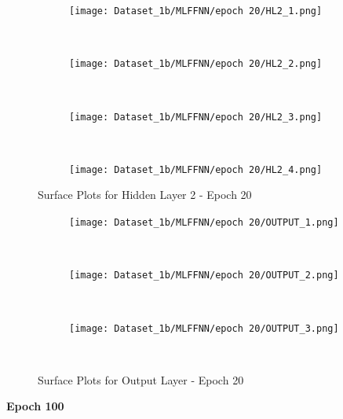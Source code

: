 \begin{figure}[!ht]
    \centering
    \begin{subfigure}[h]{0.5\textwidth}
        \centering
        \texttt{[image: Dataset\_1b/MLFFNN/epoch 20/HL2\_1.png]}
    \end{subfigure}%
    ~ 
    \begin{subfigure}[h]{0.5\textwidth}
        \centering
        \texttt{[image: Dataset\_1b/MLFFNN/epoch 20/HL2\_2.png]}
    \end{subfigure}%
    ~
    
    \begin{subfigure}[h]{0.4\textwidth}
        \centering
        \texttt{[image: Dataset\_1b/MLFFNN/epoch 20/HL2\_3.png]}
    \end{subfigure}
    ~
    \begin{subfigure}[h]{0.4\textwidth}
        \centering
        \texttt{[image: Dataset\_1b/MLFFNN/epoch 20/HL2\_4.png]}
    \end{subfigure}
    \caption{Surface Plots for Hidden Layer 2 - Epoch 20}
    \label{fig:13}
\end{figure}


\begin{figure}[!ht]
    \centering
    \begin{subfigure}[h]{0.5\textwidth}
        \centering
        \texttt{[image: Dataset\_1b/MLFFNN/epoch 20/OUTPUT\_1.png]}
    \end{subfigure}%
    ~ 
    \begin{subfigure}[h]{0.5\textwidth}
        \centering
        \texttt{[image: Dataset\_1b/MLFFNN/epoch 20/OUTPUT\_2.png]}
    \end{subfigure}%
    ~
    
    \begin{subfigure}[h]{0.4\textwidth}
        \centering
        \texttt{[image: Dataset\_1b/MLFFNN/epoch 20/OUTPUT\_3.png]}
    \end{subfigure}
    ~
    \caption{Surface Plots for Output Layer - Epoch 20}
    \label{fig:13}
\end{figure}




\newpage

\textbf{Epoch 100}


